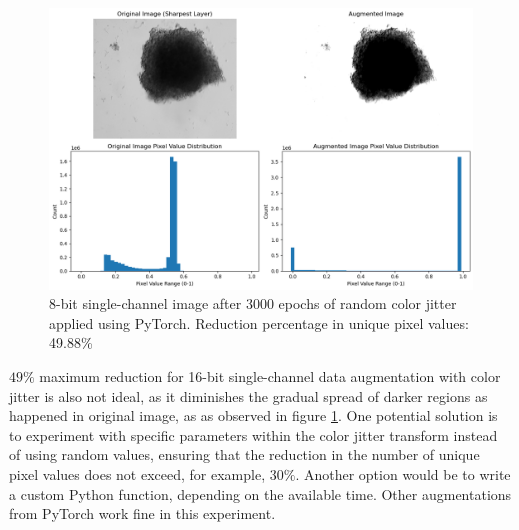 \begin{figure}[H]
  \centering
  \includegraphics[scale=0.5]{figures/16bit_onen.png} 
  \caption{8-bit single-channel image after 3000 epochs of random color jitter applied using PyTorch. Reduction percentage in unique pixel values: 49.88\%}
  \label{fig:16bit_n one}
\end{figure}

$49\%$ maximum reduction for 16-bit single-channel data augmentation with color jitter is also not ideal, as it diminishes the gradual spread of darker regions as happened in original image, as  as observed in figure \ref{fig:16bit_n one}. One potential solution is to experiment with specific parameters within the color jitter transform instead of using random values, ensuring that the reduction in the number of unique pixel values does not exceed, for example, $30\%$. Another option would be to write a custom Python function, depending on the available time. Other augmentations from PyTorch work fine in this experiment.
